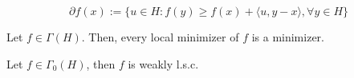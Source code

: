 \begin{definition}
    \begin{displaymath}
        \partial f (x):= \{u\in H: f(y)\geq f(x) + \langle u, y-x \rangle, \forall y \in H\}    
    \end{displaymath}
    
\end{definition}

\begin{proposition}
    Let $f \in \Gamma(H)$. Then, every local minimizer of $f$ is a minimizer.
\end{proposition}

\begin{proposition}
    Let $f \in \Gamma_0 (H)$, then $f$ is weakly l.s.c.
\end{proposition}

